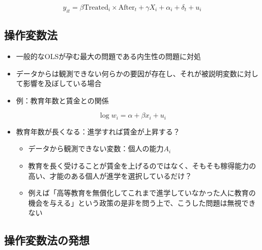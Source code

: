 \documentclass[
]{ltjsarticle}
\providecommand{\tightlist}{%
  \setlength{\itemsep}{0pt}\setlength{\parskip}{0pt}}
\begin{document}
\[y_{it} = \beta \text{Treated}_{i} \times \text{After}_{t} + \gamma X_i + \alpha_i + \delta_t + u_i\]

\hypertarget{ux64cdux4f5cux5909ux6570ux6cd5}{%
\subsection{操作変数法}\label{ux64cdux4f5cux5909ux6570ux6cd5}}

\begin{itemize}
\tightlist
\item
  一般的なOLSが孕む最大の問題である内生性の問題に対処
\item
  データからは観測できない何らかの要因が存在し、それが被説明変数に対して影響を及ぼしている場合
\item
  例：教育年数と賃金との関係
\end{itemize}

\[\log w_i = \alpha + \beta x_i + u_i\]

\begin{itemize}
\tightlist
\item
  教育年数が長くなる：進学すれば賃金が上昇する？

  \begin{itemize}
  \tightlist
  \item
    データから観測できない変数：個人の能力\(A_i\)
  \item
    教育を長く受けることが賃金を上げるのではなく、そもそも稼得能力の高い、才能のある個人が進学を選択しているだけ？
  \item
    例えば「高等教育を無償化してこれまで進学していなかった人に教育の機会を与える」という政策の是非を問う上で、こうした問題は無視できない
  \end{itemize}
\end{itemize}

\hypertarget{ux64cdux4f5cux5909ux6570ux6cd5ux306eux767aux60f3}{%
\subsection{操作変数法の発想}\label{ux64cdux4f5cux5909ux6570ux6cd5ux306eux767aux60f3}}
\end{document}
